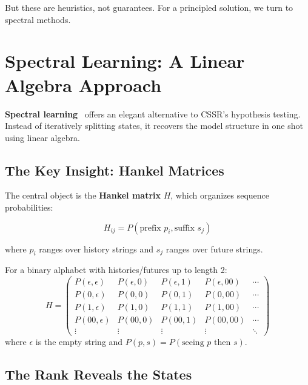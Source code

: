 \documentclass[11pt,a4paper]{article}
\theoremstyle{definition}
\theoremstyle{plain}
\begin{document}
But these are heuristics, not guarantees. For a principled solution, we turn to spectral methods.

\section{Spectral Learning: A Linear Algebra Approach}
\label{sec:spectral}

\textbf{Spectral learning}~\cite{hsu2012spectral,boots2011closing} offers an elegant alternative to CSSR's hypothesis testing. Instead of iteratively splitting states, it recovers the model structure in one shot using linear algebra.

\subsection{The Key Insight: Hankel Matrices}

The central object is the \textbf{Hankel matrix} $H$, which organizes sequence probabilities:

\begin{equation}
    H_{ij} = P(\text{prefix } p_i, \text{suffix } s_j)
\end{equation}

where $p_i$ ranges over history strings and $s_j$ ranges over future strings.

\begin{example}[title=A Small Hankel Matrix]
For a binary alphabet with histories/futures up to length 2:
\[
H = \begin{pmatrix}
P(\epsilon, \epsilon) & P(\epsilon, 0) & P(\epsilon, 1) & P(\epsilon, 00) & \cdots \\
P(0, \epsilon) & P(0, 0) & P(0, 1) & P(0, 00) & \cdots \\
P(1, \epsilon) & P(1, 0) & P(1, 1) & P(1, 00) & \cdots \\
P(00, \epsilon) & P(00, 0) & P(00, 1) & P(00, 00) & \cdots \\
\vdots & \vdots & \vdots & \vdots & \ddots
\end{pmatrix}
\]
where $\epsilon$ is the empty string and $P(p, s) = P(\text{seeing } p \text{ then } s)$.
\end{example}

\subsection{The Rank Reveals the States}
\end{document}
